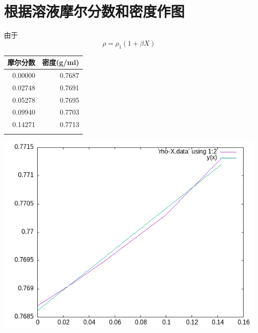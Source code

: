 \documentclass[11pt]{report}
\begin{document}
\section{根据溶液摩尔分数和密度作图}
\label{sec:org39a48a6}
由于
\[
\rho=\rho_{1}(1+\beta X)
\]
\begin{center}
\begin{tabular}{rr}
摩尔分数 & 密度(g/ml)\\
\hline
0.00000 & 0.7687\\
0.02748 & 0.7691\\
0.05278 & 0.7695\\
0.09940 & 0.7703\\
0.14271 & 0.7713\\
 & \\
\end{tabular}
\end{center}
\begin{center}
\includegraphics[width=.9\linewidth]{../data/rho-X.png}
\end{center}
\end{document}
